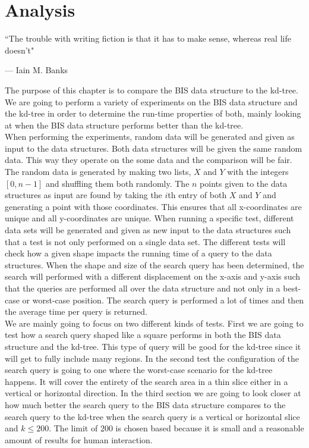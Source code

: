 \chapter{Analysis}
\label{ch:analysis}
\epigraph{``The trouble with writing fiction is that it has to make sense, whereas real life doesn't"}{--- \textup{Iain M. Banks}}

The purpose of this chapter is to compare the BIS data structure to the kd-tree. We are going to perform a variety of experiments on the BIS data structure and the kd-tree in order to determine the run-time properties of both, mainly looking at when the BIS data structure performs better than the kd-tree. \\


When performing the experiments, random data will be generated and given as input to the data structures. Both data structures will be given the same random data. This way they operate on the some data and the comparison will be fair. The random data is generated by making two lists, $X$ and $Y$ with the integers $[0,n-1]$ and shuffling them both randomly. The $n$ points given to the data structures as input are found by taking the $i$th entry of both $X$ and $Y$ and generating a point with those coordinates. This ensures that all x-coordinates are unique and all y-coordinates are unique. When running a specific test, different data sets will be generated and given as new input to the data structures such that a test is not only performed on a single data set. The different tests will check how a given shape impacts the running time of a query to the data structures. When the shape and size of the search query has been determined, the search will performed with a different displacement on the x-axis and y-axis such that the queries are performed all over the data structure and not only in a best-case or worst-case position. The search query is performed a lot of times and then the average time per query is returned. \\

We are mainly going to focus on two different kinds of tests. First we are going to test how a search query shaped like a square performs in both the BIS data structure and the kd-tree. This type of query will be good for the kd-tree since it will get to fully include many regions. In the second test the configuration of the search query is going to one where the worst-case scenario for the kd-tree happens. It will cover the entirety of the search area in a thin slice either in a vertical or horizontal direction. In the third section we are going to look closer at how much better the search query to the BIS data structure compares to the search query to the kd-tree when the search query is a vertical or horizontal slice and $k \leq 200$. The limit of $200$ is chosen based because it is small and a reasonable amount of results for human interaction.\\

